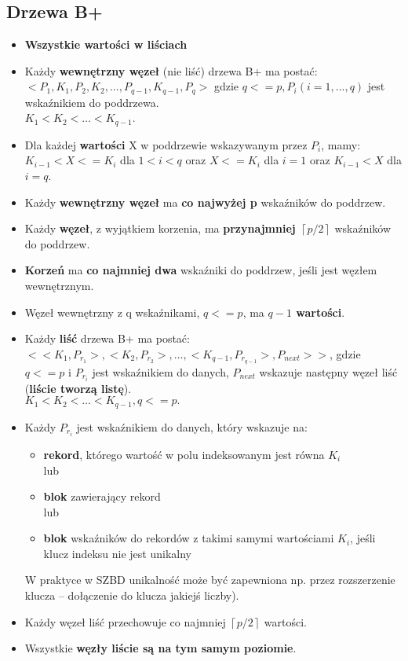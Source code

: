 \documentclass[a4paper]{article}
\begin{document}
\subsection{Drzewa B+}
\begin{itemize}
    \item \textbf{Wszystkie wartości w liściach}
    \item Każdy \textbf{wewnętrzny węzeł} (nie liść) drzewa B+ ma postać: \\
    $<P_1, K_1, P_2, K_2, \dots , P_{q-1}, K_{q-1}, P_q>$
gdzie $q<=p, P_i (i=1,...,q)$ jest wskaźnikiem do poddrzewa.\\
$K_1 < K_2 < \dots < K_{q-1}$.
    \item Dla każdej \textbf{wartości} X w poddrzewie wskazywanym przez $P_i$, mamy: $K_{i-1} < X <= K_i$ dla $1 < i < q$ oraz $X <= K_i$ dla $i = 1$ oraz $K_{i-1} < X$ dla $i = q$.
    \item Każdy \textbf{wewnętrzny węzeł} ma \textbf{co najwyżej p} wskaźników do poddrzew.
    \item Każdy \textbf{węzeł}, z wyjątkiem korzenia, ma \textbf{przynajmniej $\left \lceil p/2 \right \rceil$} wskaźników do poddrzew. 
    \item \textbf{Korzeń} ma \textbf{co najmniej dwa} wskaźniki do poddrzew, jeśli jest węzłem wewnętrznym.
    \item Węzeł wewnętrzny z q wskaźnikami, $q <= p$, ma \textbf{$q-1$ wartości}.
    \item Każdy \textbf{liść} drzewa B+ ma postać:\\ $<<K_1,P_{r_1}>, < K_2,P_{r_2} >, \dots , < K_{q-1},P_{r_{q-1}} >,P_{next}>>$, gdzie $q <= p$ i $P_{r_i}$ jest wskaźnikiem do danych, $P_{next}$ wskazuje następny węzeł liść (\textbf{liście tworzą listę}).\\
    $K_1 < K_2 < \dots < K_{q-1}, q <= p.$
    \item Każdy $P_{r_i}$ jest wskaźnikiem do danych, który wskazuje na:
    \begin{itemize}
        \item \textbf{rekord}, którego wartość w polu indeksowanym jest równa $K_i$\\
        lub 
        \item \textbf{blok} zawierający rekord\\
        lub 
        \item \textbf{blok} wskaźników do rekordów z takimi samymi wartościami $K_i$, jeśli klucz indeksu nie jest unikalny
    \end{itemize}
    W praktyce w SZBD unikalność może być zapewniona np. przez rozszerzenie klucza – dołączenie do klucza jakiejś liczby).
    \item Każdy węzeł liść przechowuje co najmniej $\left \lceil p/2 \right \rceil$ wartości.
    \item Wszystkie \textbf{węzły liście są na tym samym poziomie}.
\end{itemize}
\end{document}
